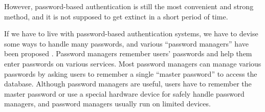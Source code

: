 \documentclass[runningheads,a4paper]{llncs}
\begin{document}
However,
password-based authentication is still the most
convenient and strong method\cite{Bonnearu:ReplacePasswords},
and it is not supposed to get extinct
in a short period of time\cite{Herley:2009:PSS:1601990.1602010}.



If we have to live with password-based authentication systems,
we have to devise some ways to handle many passwords, and
various ``password managers'' have been proposed
\cite{OnePassword}%
\cite{Dashlane}%
\cite{ミルパス}%
\cite{LastPass}%
\cite{KeyPass}%
\cite{NortonIDSafe}%
\cite{IDManager}.
%
Password managers remember users' passwords and help them enter
passwords on various services.
%
%
Most password managers can manage various passwords by
asking users to remember a single ``master password'' to access the database.
%
%
Although password managers are useful,
users have to remember the master password
or use a special hardware device
for safely handle password managers, and
password managers usually run on limited devices.

%
\end{document}
